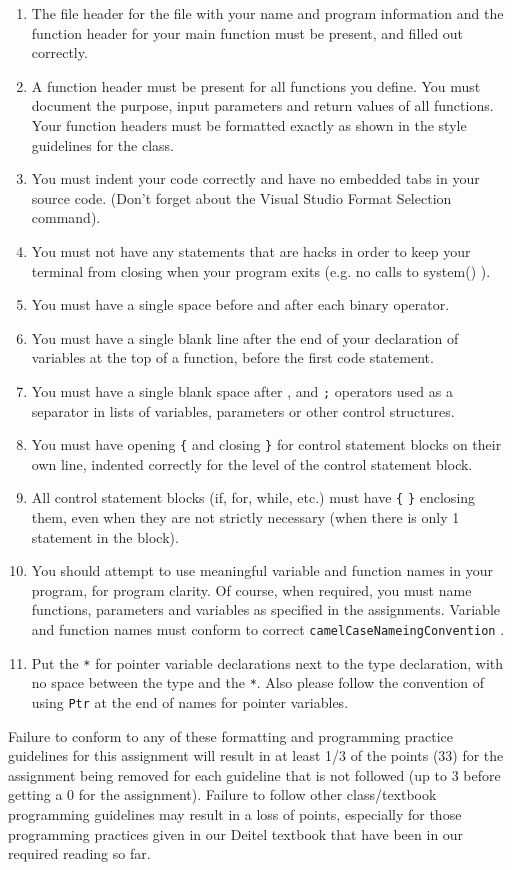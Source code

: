\documentclass[11pt]{article}
\begin{document}
\begin{enumerate}
\item The file header for the file with your name and program information
  and the function header for your main function must be present, and
  filled out correctly.
\item A function header must be present for all functions you define.
   You must document the purpose, input parameters and return values
   of all functions.  Your function headers must be formatted exactly
   as shown in the style guidelines for the class.
\item You must indent your code correctly and have no embedded tabs in
  your source code. (Don't forget about the Visual Studio Format
  Selection command).
\item You must not have any statements that are hacks in order to keep
   your terminal from closing when your program exits (e.g. no calls
   to system() ).
\item You must have a single space before and after each binary operator.
\item You must have a single blank line after the end of your declaration
  of variables at the top of a function, before the first code
  statement.
\item You must have a single blank space after , and \verb~;~ operators used as a
  separator in lists of variables, parameters or other control
  structures.
\item You must have opening \verb~{~ and closing \verb~}~ for control statement blocks
  on their own line, indented correctly for the level of the control
  statement block.
\item All control statement blocks (if, for, while, etc.) must have \verb~{~
   \verb~}~ enclosing them, even when they are not strictly necessary
   (when there is only 1 statement in the block).
\item You should attempt to use meaningful variable and function names in
   your program, for program clarity.  Of course, when required, you
   must name functions, parameters and variables as specified in the
   assignments.  Variable and function names must conform to correct
   \verb~camelCaseNameingConvention~ .
\item Put the \verb~*~ for pointer variable declarations next to the
   type declaration, with no space between the type and the \verb~*~.
   Also please follow the convention of using \verb~Ptr~ at the end of
   names for pointer variables.
\end{enumerate}

Failure to conform to any of these formatting and programming practice
guidelines for this assignment will result in at least 1/3 of the
points (33) for the assignment being removed for each guideline that
is not followed (up to 3 before getting a 0 for the
assignment). Failure to follow other class/textbook programming
guidelines may result in a loss of points, especially for those
programming practices given in our Deitel textbook that have been in
our required reading so far.
\end{document}
